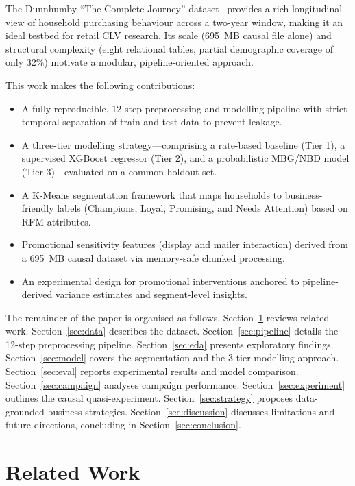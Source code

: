 \documentclass[conference]{IEEEtran}
\begin{document}
The Dunnhumby ``The Complete Journey'' dataset~\cite{dunnhumby2014} provides a rich
longitudinal view of household purchasing behaviour across a
two-year window, making it an ideal testbed for retail CLV
research. Its scale (695~MB causal file alone) and structural
complexity (eight relational tables, partial demographic coverage
of only 32\%) motivate a modular, pipeline-oriented approach.

This work makes the following contributions:
\begin{itemize}
  \item A fully reproducible, 12-step preprocessing and modelling
        pipeline with strict temporal separation of train and test
        data to prevent leakage.
  \item A three-tier modelling strategy—comprising a rate-based 
        baseline (Tier 1), a supervised XGBoost regressor (Tier 2), 
        and a probabilistic MBG/NBD model (Tier 3)—evaluated on a 
        common holdout set.
  \item A K-Means segmentation framework that maps households to
        business-friendly labels (Champions, Loyal, Promising, 
        and Needs Attention) based on RFM attributes.
  \item Promotional sensitivity features (display and mailer 
        interaction) derived from a 695~MB causal dataset via 
        memory-safe chunked processing.
  \item An experimental design for promotional interventions 
        anchored to pipeline-derived variance estimates and 
        segment-level insights.
\end{itemize}

The remainder of the paper is organised as follows.
Section~\ref{sec:related} reviews related work.
Section~\ref{sec:data} describes the dataset.
Section~\ref{sec:pipeline} details the 12-step preprocessing pipeline.
Section~\ref{sec:eda} presents exploratory findings.
Section~\ref{sec:model} covers the segmentation and the 3-tier modelling approach.
Section~\ref{sec:eval} reports experimental results and model comparison.
Section~\ref{sec:campaign} analyses campaign performance.
Section~\ref{sec:experiment} outlines the causal quasi-experiment.
Section~\ref{sec:strategy} proposes data-grounded business strategies.
Section~\ref{sec:discussion} discusses limitations and future directions,
concluding in Section~\ref{sec:conclusion}.

\section{Related Work}
\label{sec:related}
\end{document}
